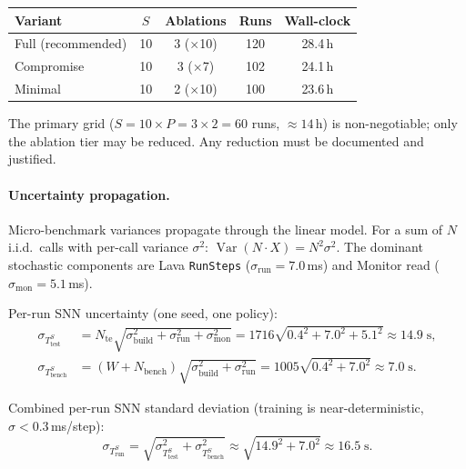 \documentclass[11pt,a4paper]{article}
\begin{document}
\begin{center}
\renewcommand{\arraystretch}{1.12}
\begin{tabular}{@{}lcccc@{}}
\toprule
\textbf{Variant} & \textbf{$S$} & \textbf{Ablations}
  & \textbf{Runs} & \textbf{Wall-clock} \\
\midrule
Full (recommended)
  & 10 & 3 ($\times$10) & 120 & 28.4\,h \\
Compromise
  & 10 & 3 ($\times$7)  & 102 & 24.1\,h \\
Minimal
  & 10 & 2 ($\times$10) & 100 & 23.6\,h \\
\bottomrule
\end{tabular}
\end{center}

\noindent The primary grid ($S=10 \times P=3 \times 2 = 60$ runs,
$\approx 14$\,h) is non-negotiable; only the ablation tier may be
reduced.  Any reduction must be documented and justified.

\paragraph{Uncertainty propagation.}
Micro-benchmark variances propagate through the linear model.
For a sum of $N$ i.i.d.\ calls with per-call variance $\sigma^2$:
$\operatorname{Var}(N \cdot X) = N^2 \sigma^2$.
The dominant stochastic components are Lava \texttt{RunSteps}
($\sigma_{\text{run}} = 7.0$\,ms) and Monitor read
($\sigma_{\text{mon}} = 5.1$\,ms).

Per-run SNN uncertainty (one seed, one policy):
\begin{align}
  \sigma_{T_{\text{test}}^{S}}
    &= N_{\text{te}}
       \sqrt{\sigma_{\text{build}}^2
           + \sigma_{\text{run}}^2
           + \sigma_{\text{mon}}^2}
     = 1716 \sqrt{0.4^2 + 7.0^2 + 5.1^2}
     \approx 14.9\;\text{s}, \label{eq:tb-sigma-test}\\
  \sigma_{T_{\text{bench}}^{S}}
    &= (W + N_{\text{bench}})
       \sqrt{\sigma_{\text{build}}^2 + \sigma_{\text{run}}^2}
     = 1005 \sqrt{0.4^2 + 7.0^2}
     \approx 7.0\;\text{s}. \label{eq:tb-sigma-bench}
\end{align}

Combined per-run SNN standard deviation (training is near-deterministic,
$\sigma < 0.3$\,ms/step):
\begin{equation}\label{eq:tb-sigma-run}
  \sigma_{T_{\text{run}}^{S}}
    = \sqrt{\sigma_{T_{\text{test}}^{S}}^2
          + \sigma_{T_{\text{bench}}^{S}}^2}
    \approx \sqrt{14.9^2 + 7.0^2}
    \approx 16.5\;\text{s}.
\end{equation}
\end{document}
